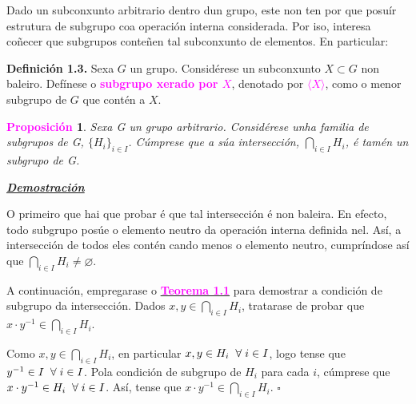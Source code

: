 \documentclass[twoside]{report}
\newcommand{\magbf}[1]{\textcolor{magenta}{\textbf{#1}}} %
\theoremstyle{mystyle}
\newtheorem{prop}{\magbf{Proposición}}[chapter]
\newenvironment{proposition}
{\begin{mdframed}[linecolor = magenta,backgroundcolor = classicrose, linewidth = 2mm]\begin{prop}}
{\end{prop}\end{mdframed}}
\begin{document}
\vspace{5mm}

\noindent Dado un subconxunto arbitrario dentro dun grupo, este non ten por que posuír estrutura de subgrupo coa operación interna considerada. Por iso, interesa coñecer que subgrupos conteñen tal subconxunto de elementos. En particular:

\vspace{3mm}

\noindent \textbf{Definición 1.3.} Sexa $G$ un grupo. Considérese un subconxunto $X \subset G$ non baleiro. Defínese o \textcolor{magenta}{\textbf{subgrupo xerado por $X$}}, denotado por \textcolor{magenta}{$\langle X \rangle$}, como o menor subgrupo de $G$ que contén a $X$.\\

\begin{proposition} \label{prop1.1}
Sexa G un grupo arbitrario. Considérese unha familia de subgrupos de G, $\{H_{i}\}_{i \in I}$. Cúmprese que a súa intersección, $\underset{i \in I}{\bigcap}H_{i}$, é tamén un subgrupo de G.
\end{proposition}

\vspace{2mm}

\noindent \textbf{\textit{\underline{Demostración}}}

\vspace{2mm}

\noindent O primeiro que hai que probar é que tal intersección é non baleira. En efecto, todo subgrupo posúe o elemento neutro da operación interna definida nel. Así, a intersección de todos eles contén cando menos o elemento neutro, cumpríndose así que $\underset{i \in I}{\bigcap}H_{i} \neq  \varnothing$.

\noindent A continuación, empregarase o \hyperref[th1.1]{\magbf{Teorema 1.1}} para demostrar a condición de subgrupo da intersección. Dados $x,y \in \underset{i \in I}{\bigcap}H_{i}$, tratarase de probar que $x \cdot y^{-1} \in \underset{i \in I}{\bigcap}H_{i}$.

\noindent Como $x,y \in \underset{i \in I}{\bigcap}H_{i}$, en particular $x,y \in H_{i} \hspace{2mm} \forall \hspace{1mm} i \in I$, logo tense que $y^{-1} \in I \hspace{2mm} \forall \hspace{1mm} i \in I$. Pola condición de subgrupo de $H_{i}$ para cada $i$, cúmprese que $x \cdot y^{-1} \in H_{i} \hspace{2mm} \forall \hspace{1mm} i \in I$. Así, tense que $x \cdot y^{-1} \in \underset{i \in I}{\bigcap}H_{i}$. $\square$
\end{document}
